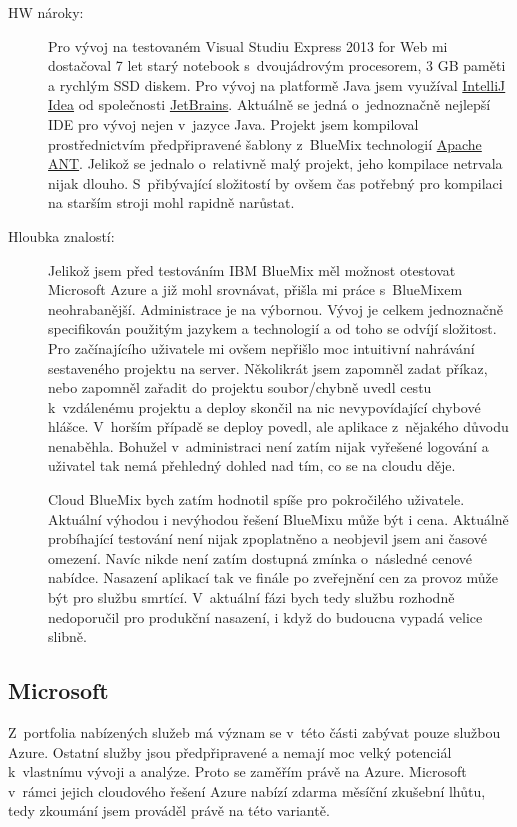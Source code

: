 \begin{description}
	\item [HW nároky:] Pro vývoj na testovaném Visual Studiu Express 2013 for Web mi dostačoval 7 let starý notebook s~dvoujádrovým procesorem, 3 GB paměti a rychlým SSD diskem. Pro vývoj na platformě Java jsem využíval \href{http://www.jetbrains.com/idea/}{IntelliJ Idea} od společnosti \href{http://www.jetbrains.com/}{JetBrains}. Aktuálně se jedná o~jednoznačně nejlepší IDE pro vývoj nejen v~jazyce Java. Projekt jsem kompiloval prostřednictvím předpřipravené šablony z~BlueMix technologií \href{http://ant.apache.org/}{Apache ANT}. Jelikož se jednalo o~relativně malý projekt, jeho kompilace netrvala nijak dlouho. S~přibývající složitostí by ovšem čas potřebný pro kompilaci na starším stroji mohl rapidně narůstat.
	\item [Hloubka znalostí:] Jelikož jsem před testováním IBM BlueMix měl možnost otestovat Microsoft Azure a již mohl srovnávat, přišla mi práce s~BlueMixem neohrabanější. Administrace je na výbornou. Vývoj je celkem jednoznačně specifikován použitým jazykem a technologií a od toho se odvíjí složitost. Pro začínajícího uživatele mi ovšem nepřišlo moc intuitivní nahrávání sestaveného projektu na server. Několikrát jsem zapomněl zadat příkaz, nebo zapomněl zařadit do projektu soubor/chybně uvedl cestu k~vzdálenému projektu a deploy skončil na nic nevypovídající chybové hlášce. V~horším případě se deploy povedl, ale aplikace z~nějakého důvodu nenaběhla. Bohužel v~administraci není zatím nijak vyřešené logování a uživatel tak nemá přehledný dohled nad tím, co se na cloudu děje.

Cloud BlueMix bych zatím hodnotil spíše pro pokročilého uživatele. Aktuální výhodou i nevýhodou řešení BlueMixu může být i cena. Aktuálně probíhající testování není nijak zpoplatněno a neobjevil jsem ani časové omezení. Navíc nikde není zatím dostupná zmínka o~následné cenové nabídce. Nasazení aplikací tak ve finále po zveřejnění cen za provoz může být pro službu smrtící. V~aktuální fázi bych tedy službu rozhodně nedoporučil pro produkční nasazení, i když do budoucna vypadá velice slibně.
\end{description}

\subsection{Microsoft}
Z~portfolia nabízených služeb má význam se v~této části zabývat pouze službou Azure. Ostatní služby jsou předpřipravené a nemají moc velký potenciál k~vlastnímu vývoji a analýze. Proto se zaměřím právě na Azure. Microsoft v~rámci jejich cloudového řešení Azure nabízí zdarma měsíční zkušební lhůtu, tedy zkoumání jsem prováděl právě na této variantě.

